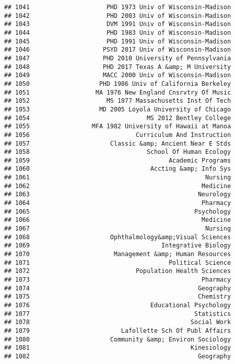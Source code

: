 \documentclass[
]{article}
\begin{document}
\begin{verbatim}
## 1041                     PHD 1973 Univ of Wisconsin-Madison
## 1042                     PHD 2003 Univ of Wisconsin-Madison
## 1043                     DVM 1991 Univ of Wisconsin-Madison
## 1044                     PHD 1983 Univ of Wisconsin-Madison
## 1045                     PHD 1991 Univ of Wisconsin-Madison
## 1046                    PSYD 2017 Univ of Wisconsin-Madison
## 1047                    PHD 2010 University of Pennsylvania
## 1048                    PHD 2017 Texas A &amp; M University
## 1049                    MACC 2000 Univ of Wisconsin-Madison
## 1050                   PHD 1986 Univ of California Berkeley
## 1051                  MA 1976 New England Cnsrvtry Of Music
## 1052                     MS 1977 Massachusetts Inst Of Tech
## 1053                   MD 2005 Loyola University of Chicago
## 1054                                MS 2012 Bentley College
## 1055                 MFA 1982 University of Hawaii at Manoa
## 1056                             Curriculum And Instruction
## 1057                      Classic &amp; Ancient Near E Stds
## 1058                                School Of Human Ecology
## 1059                                      Academic Programs
## 1060                                 Accting &amp; Info Sys
## 1061                                                Nursing
## 1062                                               Medicine
## 1063                                              Neurology
## 1064                                               Pharmacy
## 1065                                             Psychology
## 1066                                               Medicine
## 1067                                                Nursing
## 1068                      Ophthalmology&amp;Visual Sciences
## 1069                                    Integrative Biology
## 1070                       Management &amp; Human Resources
## 1071                                      Political Science
## 1072                             Population Health Sciences
## 1073                                               Pharmacy
## 1074                                              Geography
## 1075                                              Chemistry
## 1076                                 Educational Psychology
## 1077                                             Statistics
## 1078                                            Social Work
## 1079                         Lafollette Sch Of Publ Affairs
## 1080                      Community &amp; Environ Sociology
## 1081                                            Kinesiology
## 1082                                              Geography

\end{verbatim}
\end{document}
